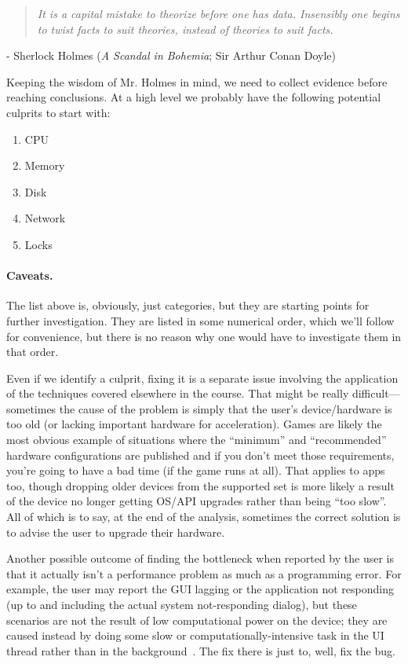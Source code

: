 \begin{quote}
\textit{It is a capital mistake to theorize before one has data. Insensibly one begins to twist facts to suit theories, instead of theories to suit facts.}
\end{quote}
\hfill - Sherlock Holmes (\textit{A Scandal in Bohemia}; Sir Arthur Conan Doyle)

Keeping the wisdom of Mr. Holmes in mind, we need to collect evidence before reaching conclusions. At a high level we probably have the following potential culprits to start with:
\begin{enumerate}[noitemsep]
	\item CPU
	\item Memory
	\item Disk
	\item Network
	\item Locks
\end{enumerate}

\paragraph{Caveats.}
The list above is, obviously, just categories, but they are starting points for further investigation. They are listed in some numerical order, which we'll follow for convenience, but there is no reason why one would have to investigate them in that order. 

Even if we identify a culprit, fixing it is a separate issue involving the application of the techniques covered elsewhere in the course. That might be really difficult---sometimes the cause of the problem is simply that the user's device/hardware is too old (or lacking important hardware for acceleration). Games are likely the most obvious example of situations where the ``minimum'' and ``recommended'' hardware configurations are published and if you don't meet those requirements, you're going to have a bad time (if the game runs at all). That applies to apps too, though dropping older devices from the supported set is more likely a result of the device no longer getting OS/API upgrades rather than being ``too slow''. All of which is to say, at the end of the analysis, sometimes the correct solution is to advise the user to upgrade their hardware.

Another possible outcome of finding the bottleneck when reported by the user is that it actually isn't a performance problem as much as a programming error. For example, the user may report the GUI lagging or the application not responding (up to and including the actual system not-responding dialog), but these scenarios are not the result of low computational power on the device; they are caused instead by doing some slow or computationally-intensive task in the UI thread rather than in the background~\cite{bottlenecks-android}. The fix there is just to, well, fix the bug.




